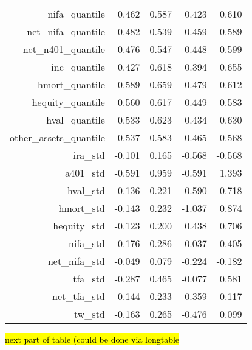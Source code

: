 \documentclass[10pt,a4paper]{article}
\begin{document}
\begin{tiny}
\begin{table}[ht]
\begin{tabular}{rrrrr}
  nifa\_quantile & 0.462 & 0.587 & 0.423 & 0.610 \\ 
  net\_nifa\_quantile & 0.482 & 0.539 & 0.459 & 0.589 \\ 
  net\_n401\_quantile & 0.476 & 0.547 & 0.448 & 0.599 \\ 
  inc\_quantile & 0.427 & 0.618 & 0.394 & 0.655 \\ 
  hmort\_quantile & 0.589 & 0.659 & 0.479 & 0.612 \\ 
  hequity\_quantile & 0.560 & 0.617 & 0.449 & 0.583 \\ 
  hval\_quantile & 0.533 & 0.623 & 0.434 & 0.630 \\ 
  other\_assets\_quantile & 0.537 & 0.583 & 0.465 & 0.568 \\ 
  ira\_std & -0.101 & 0.165 & -0.568 & -0.568 \\ 
  a401\_std & -0.591 & 0.959 & -0.591 & 1.393 \\ 
  hval\_std & -0.136 & 0.221 & 0.590 & 0.718 \\ 
  hmort\_std & -0.143 & 0.232 & -1.037 & 0.874 \\ 
  hequity\_std & -0.123 & 0.200 & 0.438 & 0.706 \\ 
  nifa\_std & -0.176 & 0.286 & 0.037 & 0.405 \\ 
  net\_nifa\_std & -0.049 & 0.079 & -0.224 & -0.182 \\ 
  tfa\_std & -0.287 & 0.465 & -0.077 & 0.581 \\ 
  net\_tfa\_std & -0.144 & 0.233 & -0.359 & -0.117 \\ 
  tw\_std & -0.163 & 0.265 & -0.476 & 0.099 \\ 

  \hline
\end{tabular}
\end{table}

\hl{next part of table (could be done via longtable}


\end{tiny}
\end{document}
